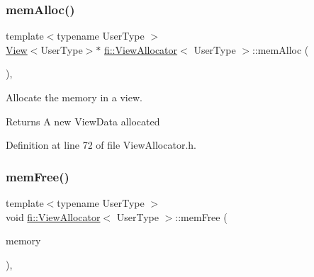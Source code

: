 \mbox{\label{classfi_1_1ViewAllocator_a6cc2583a683f09e59f35d7180fe0c188}} 
\subsubsection{\texorpdfstring{mem\+Alloc()}{memAlloc()}\hspace{0.1cm}{\footnotesize\ttfamily [2/2]}}
{\footnotesize\ttfamily template$<$typename User\+Type $>$ \\
\hyperlink{classfi_1_1View}{View}$<$User\+Type$>$$\ast$ \hyperlink{classfi_1_1ViewAllocator}{fi\+::\+View\+Allocator}$<$ User\+Type $>$\+::mem\+Alloc (\begin{DoxyParamCaption}{ }\end{DoxyParamCaption})\hspace{0.3cm}{\ttfamily [inline]}, {\ttfamily [override]}}



Allocate the memory in a view. 

\begin{DoxyReturn}{Returns}
A new View\+Data allocated 
\end{DoxyReturn}


Definition at line 72 of file View\+Allocator.\+h.

\mbox{\label{classfi_1_1ViewAllocator_a63bd33e7f615ea7dcc138e988f4a09e9}} 
\subsubsection{\texorpdfstring{mem\+Free()}{memFree()}}
{\footnotesize\ttfamily template$<$typename User\+Type $>$ \\
void \hyperlink{classfi_1_1ViewAllocator}{fi\+::\+View\+Allocator}$<$ User\+Type $>$\+::mem\+Free (\begin{DoxyParamCaption}\item[{\hyperlink{classfi_1_1View}{View}$<$ User\+Type $>$ $\ast$\&}]{memory }\end{DoxyParamCaption})\hspace{0.3cm}{\ttfamily [inline]}, {\ttfamily [override]}}



